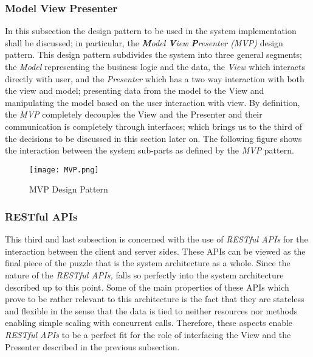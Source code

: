 \subsubsection{Model View Presenter}
In this subsection the design pattern to be used in the system implementation shall be discussed; in particular, the \emph{\textbf{M}odel \textbf{V}iew \textbf{P}resenter (MVP)} design pattern. This design pattern subdivides the system into three general segments; the \emph{Model} representing the business logic and the data, the \emph{View} which interacts directly with user, and the \emph{Presenter} which has a two way interaction with both the view and model; presenting data from the model to the View and manipulating the model based on the user interaction with view. By definition, the \emph{MVP} completely decouples the View and the Presenter and their communication is completely through interfaces; which brings us to the third of the decisions to be discussed in this section later on. The following figure shows the interaction between the system sub-parts as defined by the \emph{MVP} pattern.

\begin{figure}[H]
\caption{MVP Design Pattern}
\label{fig:MVP-desgn-patt}
\centering
\texttt{[image: MVP.png]}
\end{figure}

\subsubsection{RESTful APIs}
This third and last subsection is concerned with the use of \emph{RESTful APIs} for the interaction between the client and server sides. These APIs can be viewed as the final piece of the puzzle that is the system architecture as a whole. Since the nature of the \emph{RESTful APIs,} falls so perfectly into the system architecture described up to this point. Some of the main properties of these APIs which prove to be rather relevant to this architecture is the fact that they are stateless and flexible in the sense that the data is tied to neither resources nor methods enabling simple scaling with concurrent calls. Therefore, these aspects enable \emph{RESTful APIs} to be a perfect fit for the role of interfacing the View and the Presenter described in the previous subsection.
